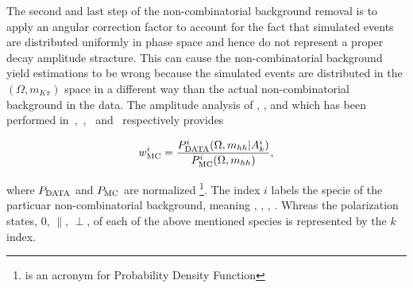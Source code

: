 The second and last step of the non-combinatorial background removal is to apply an angular correction factor to account for the fact that
simulated events are distributed uniformly in phase space and hence do not represent a proper decay amplitude stracture.
This can cause the non-combinatorial background yield estimations to be wrong because the simulated events are distributed in the $(\Omega, m_{K\pi})$ space
in a different way than the actual non-combinatorial background in the data. The amplitude analysis of \BdJpsipipi, \BsJpsipipi, \BsJpsiKK and \LbJpsipK
which has been performed in~\cite{SheldonBdpipi},~\cite{SheldonBspipi},~\cite{SheldonKK} and~\cite{Gao:1701984} respectively provides

\begin{equation}
\centering
w_{\rm MC}^i = \frac{P_{\rm DATA}^i (\Omega, m_{hh}  | A_k^i)} {P_{\rm MC}^i(\Omega, m_{hh})},
\end{equation}

\noindent where $P_{\rm DATA}$ and $P_{\rm MC}$ are normalized \pdfs\footnote{\pdf is an acronym for Probability Density Function}.
The index $i$ labels the specie of the particuar non-combinatorial background, meaning \BdJpsipipi, \BsJpsipipi, \BsJpsiKK, \LbJpsipK.
Whreas the polarization states, $0$, $\parallel$, $\perp$, of each of the above mentioned species is represented by the $k$ index.

